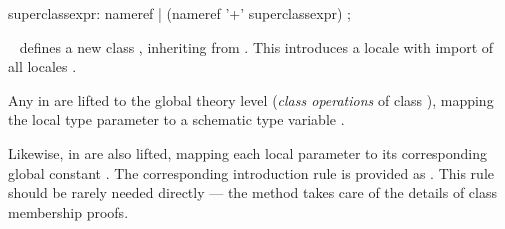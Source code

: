 \begin{isabellebody}
\begin{isamarkuptext}
\begin{rail}
    superclassexpr: nameref | (nameref '+' superclassexpr)
    ;
  \end{rail}

  \begin{description}

  \item \hyperlink{command.class}{\mbox{}}~ defines
  a new class , inheriting from .  This
  introduces a locale  with import of all locales .

  Any \hyperlink{element.fixes}{\mbox{}} in  are lifted to the global
  theory level (\emph{class operations}  of class ), mapping the local type parameter
  \isa{{\isasymalpha}} to a schematic type variable .

  Likewise, \hyperlink{element.assumes}{\mbox{}} in  are also lifted,
  mapping each local parameter  to its
  corresponding global constant .  The
  corresponding introduction rule is provided as .  This rule should be rarely needed directly
  --- the \hyperlink{method.intro-classes}{\mbox{}} method takes care of the details of
  class membership proofs.


\end{description}
\end{isamarkuptext}
\end{isabellebody}
